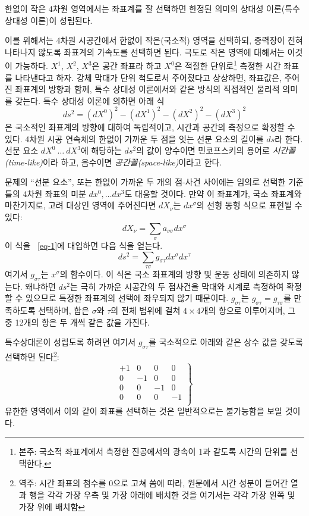 \documentclass[b5paper]{article}
\begin{document}
한없이 작은 4차원 영역에서는 좌표계를 잘 선택하면 한정된 의미의 상대성 이론(특수 상대성 이론)이 성립된다.

이를 위해서는 4차원 시공간에서 한\-없이 작은(국소적) 영역을 선택하되, 중력장이 전혀 나타나지 않도록 좌표계의 가속도를 선택하면 된다. 극도로 작은 영역에 대해서는 이것이 가능하다. $X^1$, $X^2$, $X^3$은 공간 좌표라 하고 $X^0$은 적절한 단위로\footnote{본주: 국소적 좌표계에서 측정한 진공에서의 광속이 1과 같도록 시간의 단위를 선택한다.}  측정한 시간 좌표를 나타낸다고 하자. 강체 막대가 단위 척도로서 주어졌다고 상상하면, 좌표값은, 주어진 좌표계의 방향과 함께, 특수 상대성 이론에서와 같은 방식의 직접적인 물리적 의미를 갖는다. 특수 상대성 이론에 의하면 아래 식
\begin{equation} \label{eq-1}
ds^2 = \left(dX^0\right)^2 - \left(dX^1\right)^2 - \left(dX^2\right)^2 - \left(dX^3\right)^2
\end{equation}
은 국소적인 좌표계의 방향에 대하여 독립적이고, 시간과 공간의 측정으로 확정할 수 있다. 4차원 시공 연속체의 한\-없이 가까운 두 점을 잇는 선분 요소의 길이를 $ds$라 한다. 선분 요소 $dX^0~\dots~dX^3$에 해당하는 $ds^2$의 값이 양수이면 민코프스키의 용어로 \emph{시간꼴(time-like)}이라 하고, 음수이면 \emph{공간꼴(space-like)}이라고 한다.

문제의 ``선분 요소'', 또는 한없이 가까운 두 개의 점-사건 사이에는 임의로 선택한 기준틀의 4차원 좌표의 미분 $ dx^0,\dots dx^3  $도 대응할 것이다. 만약 이 좌표계가, 국소 좌표계와 마찬가지로, 고려 대상인 영역에 주어진다면 $dX_\nu$는 $dx^\sigma$의 선형 동형 식으로 표현될 수 있다:
\begin{equation} \label{eq-2} dX_{\nu} = \sum_{\sigma} a_{\nu\sigma}dx^{\sigma}\end{equation}
이 식을 ~\eqref{eq-1}에 대입하면 다음 식을 얻는다.
\begin{equation} \label{eq-3} ds^2 = \sum_{\tau\sigma} g_{\sigma\tau} dx^{\sigma} dx^{\tau}\end{equation}
여기서 $g_{\sigma\tau}$는 $x^\sigma$의 함수이다. 이 식은 국소 좌표계의 방향 및 운동 상태에 의존하지 않는다. 왜냐하면 $ds^2$는 극히 가까운 시공간의 두 점사건을 막대와 시계로 측정하여 확정할 수 있으므로 특정한 좌표계의 선택에 좌우되지 않기 때문이다. 
$g_{\sigma\tau}$는 $g_{\sigma\tau}=g_{\tau\sigma}$를 만족하도록 선택하며, 합은 $\sigma$와 $\tau$의 전체 범위에 걸쳐 $4\times4$개의 항으로 이루어지며, 그 중 12개의 항은 두 개씩 같은 값을 가진다.\par
특수상대론이 성립도록 하려면 여기서 $g_{\sigma\tau}$를 국소적으로 아래와 같은 상수 값을 갖도록 선택하면 된다\footnote{역주: 시간 좌표의 첨수를 0으로 고쳐 씀에 따라, 원문에서 시간 성분이 들어간 열과 행을 각각 가장 우측 및 가장 아래에 배치한 것을 여기서는 각각 가장 왼쪽 및 가장 위에 배치함}: 
\begin{equation} \label{eq-4}
\left.\begin{array}{cccc}
	+1 & 0 & 0 & 0 \\
	0 & -1 & 0 & 0 \\
	0 & 0 & -1 & 0 \\
	0 & 0 & 0 & -1 \\
\end{array}\right\} \end{equation}
유한한 영역에서 이와 같이 좌표를 선택하는 것은 일반적으로는 불가능함을 보일 것이다.
\end{document}
